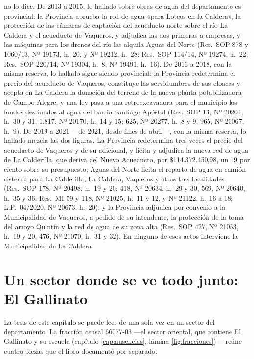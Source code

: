 no lo dice. De 2013 a 2015, lo hallado sobre obras de agua del departamento es provincial: la Provincia aprueba la red de agua «para Loteos en la Caldera», la protección de las cámaras de captación del acueducto norte sobre el río La Caldera y el acueducto de Vaqueros, y adjudica las dos primeras a empresas, y las máquinas para los drenes del río las alquila Aguas del Norte (Res.\ SOP 878 y 1060/13, Nº 19173, h.\ 20, y Nº 19212, h.\ 28; Res.\ SOP 114/14, Nº 19274, h.\ 22; Res.\ SOP 220/14, Nº 19304, h.\ 8; Nº 19491, h.\ 16). De 2016 a 2018, con la misma reserva, lo hallado sigue siendo provincial: la Provincia redetermina el precio del acueducto de Vaqueros, constituye las servidumbres de sus cloacas y acepta en La Caldera la donación del terreno de la nueva planta potabilizadora de Campo Alegre, y una ley pasa a una retroexcavadora para el municipio los fondos destinados al agua del barrio Santiago Apóstol (Res.\ SOP 13, Nº 20204, h.\ 30 y 31; 1.817, Nº 20170, h.\ 14 y 15; 625, Nº 20277, h.\ 8 y 9; 965, Nº 20067, h.\ 9). De 2019 a 2021 ---de 2021, desde fines de abril---, con la misma reserva, lo hallado mezcla las dos figuras. La Provincia redetermina tres veces el precio del acueducto de Vaqueros y de su adicional, y licita y adjudica la nueva red de agua de La Calderilla, que deriva del Nuevo Acueducto, por \$114.372.450,98, un 19 por ciento sobre su presupuesto; Aguas del Norte licita el reparto de agua en camión cisterna para La Calderilla, La Caldera, Vaqueros y otras tres localidades (Res.\ SOP 178, Nº 20498, h.\ 19 y 20; 418, Nº 20634, h.\ 29 y 30; 569, Nº 20640, h.\ 35 y 36; Res.\ MI 59 y 118, Nº 21025, h.\ 11 y 12, y Nº 21122, h.\ 16 a 18; L.P.\ 04/2020, Nº 20673, h.\ 20); y la Provincia adjudica por convenio a la Municipalidad de Vaqueros, a pedido de su intendente, la protección de la toma del arroyo Quintín y la red de agua de su zona alta (Res.\ SOP 427, Nº 21053, h.\ 19 y 20; 476, Nº 21070, h.\ 31 y 32). En ninguno de esos actos interviene la Municipalidad de La Caldera.

\section{Un sector donde se ve todo junto: El Gallinato}

La tesis de este capítulo se puede leer de una sola vez en un sector del departamento. La
fracción censal 66077-03 ---el sector oriental, que contiene El Gallinato y su escuela (capítulo
\ref{cap:ausencias}, lámina \ref{fig:fracciones})--- reúne cuatro piezas que el libro documentó por separado.

